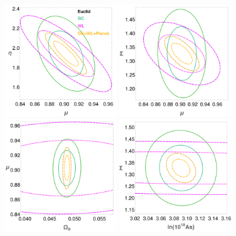 \begin{figure}[htbp]
\centering{}
\includegraphics[width=0.45\textwidth]{Chapters/linear-nonlinear-MG-forecasts/figures/ellipses/T-related/ellipsesPlot-withLegend-Manual-MuEtaFisher-Marged-fiducialMGTR2nonuhs-GC_WL_GC+WL+Planck--nlHS-pars-6-7_-.pdf}
\includegraphics[width=0.45\textwidth]{Chapters/linear-nonlinear-MG-forecasts/figures/ellipses/T-related/ellipsesPlot-noLegend-Manual-MuSigmaFisher-Marged-fiducialMGTR2nonuhs-GC_WL_GC+WL+Planck--nlHS-pars-6-7_-.pdf}
\\
\includegraphics[width=0.45\textwidth]{Chapters/linear-nonlinear-MG-forecasts/figures/ellipses/T-related/ellipsesPlot-noLegend-Manual-MuSigmaFisher-Marged-fiducialMGTR2nonuhs-GC_WL_GC+WL+Planck--nlHS-pars-2-6_-.pdf}
\includegraphics[width=0.45\textwidth]{Chapters/linear-nonlinear-MG-forecasts/figures/ellipses/T-related/ellipsesPlot-noLegend-Manual-MuSigmaFisher-Marged-fiducialMGTR2nonuhs-GC_WL_GC+WL+Planck--nlHS-pars-4-7_-.pdf}

\end{figure}
